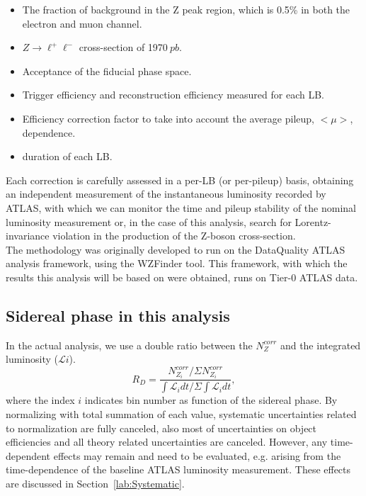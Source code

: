 \begin{itemize}
   \item The fraction of background in the Z peak region, which is 0.5\% in both the electron and muon channel.
   \item $Z\rightarrow \ell^+\ell^-$ cross-section of 1970$~pb$. 
   \item Acceptance of the fiducial phase space. 
   \item Trigger efficiency and reconstruction efficiency measured for each LB.
   \item Efficiency correction factor to take into account the average pileup, $<\mu>$, dependence. 
   \item duration of each LB.
\end{itemize}

Each correction is carefully assessed in a per-LB (or per-pileup) basis, obtaining an independent measurement of the instantaneous luminosity recorded by ATLAS, with which we can monitor the time and pileup stability of the nominal luminosity measurement or, in the case of this analysis, search for Lorentz-invariance violation in the production of the Z-boson cross-section.\\

The methodology was originally developed to run on the DataQuality ATLAS analysis framework, using the WZFinder tool. This framework, with which the results this analysis will be based on were obtained, runs on Tier-0 ATLAS data.

\subsection{Sidereal phase in this analysis}

In the actual analysis, we use a double ratio between the $N_Z^{corr}$ and the integrated luminosity ($\mathcal{L}i$). 
\begin{equation}
  R_D = \frac{ N_{Z_i}^{corr} /\Sigma N_{Z_i}^{corr}}{\int\mathcal{L}_i dt / \Sigma \int\mathcal{L}_idt},
\label{eq:double_ratio}
\end{equation}
where the index $i$ indicates bin number as function of the sidereal phase. 
By normalizing with total summation of each value, systematic uncertainties related to normalization are fully canceled, 
also most of uncertainties on object efficiencies and all theory related uncertainties are canceled. 
However, any time-dependent effects may remain and need to be evaluated, e.g. arising from the 
time-dependence of the baseline ATLAS luminosity measurement. These effects are discussed in Section~\ref{lab:Systematic}.

